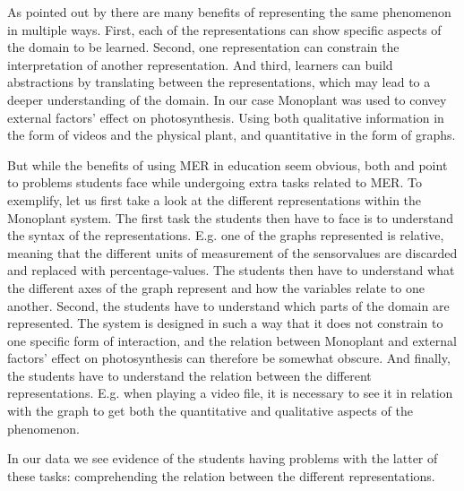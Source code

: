 As pointed out by \citet{van2006supporting} there are many benefits of representing the same phenomenon in multiple ways. First, each of the representations can show specific aspects of the domain to be learned. Second, one representation can constrain the interpretation of another representation. And third, learners can build abstractions by translating between the representations, which may lead to a deeper understanding of the domain. In our case Monoplant was used to convey external factors' effect on photosynthesis. Using both qualitative information in the form of videos and the physical plant, and quantitative in the form of graphs. 

But while the benefits of using MER in education seem obvious, both \citet{ainsworth1999functions} and \citet{van2006supporting} point to problems students face while undergoing extra tasks related to MER. To exemplify, let us first take a look at the different representations within the Monoplant system. The first task the students then have to face is to understand the syntax of the representations. E.g. one of the graphs represented is relative, meaning that the different units of measurement of the sensorvalues are discarded and replaced with percentage-values. The students then have to understand what the different axes of the graph represent and how the variables relate to one another. Second, the students have to understand which parts of the domain are represented. The system is designed in such a way that it does not constrain to one specific form of interaction, and the relation between Monoplant and external factors' effect on photosynthesis can therefore be somewhat obscure. And finally, the students have to understand the relation between the different representations. E.g. when playing a video file, it is necessary to see it in relation with the graph to get both the quantitative and qualitative aspects of the phenomenon. 

In our data we see evidence of the students having problems with the latter of these tasks: comprehending the relation between the different representations. 




